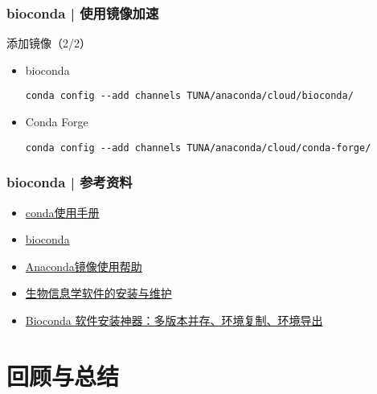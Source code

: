 \begin{frame}[fragile]
  \frametitle{bioconda | 使用镜像加速}
  \begin{block}{添加镜像（2/2）}
    \begin{itemize}
      \item bioconda
\begin{lstlisting}
conda config --add channels TUNA/anaconda/cloud/bioconda/
\end{lstlisting}
      \item Conda Forge
\begin{lstlisting}
conda config --add channels TUNA/anaconda/cloud/conda-forge/
\end{lstlisting}
    \end{itemize}
  \end{block}
\end{frame}

\begin{frame}
  \frametitle{bioconda | 参考资料}
  \begin{itemize}
    \item \href{https://conda.io/docs/}{conda使用手册}
    \item \href{https://bioconda.github.io/}{bioconda}
    \item \href{https://mirrors.tuna.tsinghua.edu.cn/help/anaconda/}{Anaconda镜像使用帮助}
    \item \href{https://github.com/Yixf-Education/demo4bx/tree/master/conda}{生物信息学软件的安装与维护}
    \item \href{https://cloud.tencent.com/developer/article/1493032}{Bioconda 软件安装神器：多版本并存、环境复制、环境导出}
  \end{itemize}
\end{frame}

\section{回顾与总结}
